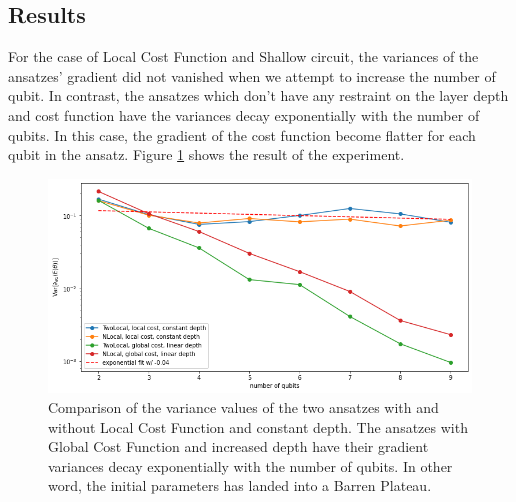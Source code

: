 \subsection{Results}

For the case of Local Cost Function and Shallow circuit, the variances of the ansatzes' gradient did not vanished when we attempt to increase the number of qubit.
In contrast, the ansatzes which don't have any restraint on the layer depth and cost function have the variances decay exponentially with the number of qubits.
In this case, the gradient of the cost function become flatter for each qubit in the ansatz.
Figure \ref{Variance Local Cost} shows the result of the experiment.

\begin{figure}
    \includegraphics[width=\textwidth]{Artefact/Appendices/variancesLCF.png}
    \caption{
        Comparison of the variance values of the two ansatzes with and without Local Cost Function and constant depth.
        The ansatzes with Global Cost Function and increased depth have their gradient variances decay exponentially with the number of qubits. 
        In other word, the initial parameters has landed into a Barren Plateau.
    }
    \label{Variance Local Cost}
\end{figure}